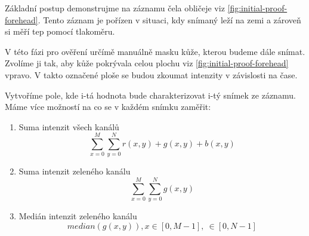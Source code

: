 \documentclass[
  digital, %
  table,   %
%
  lof,     %
  lot,     %
]{fithesis3}
\begin{document}
Základní postup demonstrujme na záznamu čela obličeje viz \ref{fig:initial-proof-forehead}. Tento záznam je pořízen v situaci, kdy snímaný leží na zemi a zároveň si měří tep pomocí tlakoměru.

V této fázi pro ověření určímě manuálně masku kůže, kterou budeme dále snímat. Zvolíme ji tak, aby kůže pokrývala celou plochu viz \ref{fig:initial-proof-forehead} vpravo. V takto označené ploše se budou zkoumat intenzity v závislosti na čase.

Vytvoříme pole, kde i-tá hodnota bude charakterizovat i-tý snímek ze záznamu. Máme více možností na co se v každém snímku zaměřit:
\begin{enumerate}
  \item{Suma intenzit všech kanálů}
  \begin{equation}
  	\sum_{x=0}^M \sum_{y=0}^N r(x,y) + g(x,y) + b(x,y)
  \end{equation}

  \item{Suma intenzit zeleného kanálu}
  \begin{equation}
  	\sum_{x=0}^M \sum_{y=0}^N g(x,y)
  \end{equation}

  \item{Medián intenzit zeleného kanálu}
  \begin{equation}
  	median(g(x,y)), x \in [0, M-1], \ \in [0, N-1]
  \end{equation}

\end{enumerate}










\end{document}
